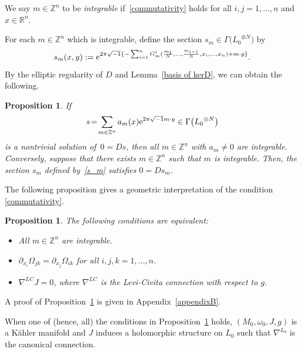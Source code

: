 \documentclass[pdftex]{sigma}
\numberwithin{equation}{section}
\newtheorem{Proposition}[Theorem]{Proposition}
 { \theoremstyle{definition}
\newtheorem{Definition}[Theorem]{Definition}
\newtheorem{Note}[Theorem]{Note}
\newtheorem{Example}[Theorem]{Example}
\newtheorem{Remark}[Theorem]{Remark} }
\newcommand{\R}{\mathbb{R}}
\newcommand{\Z}{\mathbb{Z}}
\begin{document}
\begin{Definition}
We say $m\in \Z^n$ to be \emph{integrable} if~\eqref{commutativity} holds for all $i, j=1,\ldots , n$ and $x\in \R^n$.
\end{Definition}

For each $m\in \Z^n$ which is integrable, define the section $s_m\in \Gamma\bigl({L_0}^{\otimes N}\bigr)$ by
\begin{equation}\label{s_m}
s_m(x,y):={\rm e}^{2\pi\sqrt{-1}\{-\sum_{i=1}^nG_m^i(\frac{m_1}{N},\ldots ,\frac{m_{i-1}}{N},x_i,\ldots ,x_n)+m\cdot y\}} .
\end{equation}
By the elliptic regularity of $D$ and Lemma~\ref{basis of kerD}, we can obtain the following.
\begin{Proposition}\label{existence condition}
If
\[
s\!=\!\sum_{m\in \Z^n}a_m(x){\rm e}^{2\pi\sqrt{-1}m\cdot y}\in \Gamma\bigl({L_0}^{\otimes N}\bigr)
\]
 is a nontrivial solution of~${0\!=\!Ds}$, then all $m\in \Z^n$ with $a_m\not=0$ are integrable. Conversely, suppose that there exists $m\in \Z^n$ such that $m$ is integrable. Then, the section $s_m$ defined by~\eqref{s_m}
satisfies $0=Ds_m$.
\end{Proposition}
%
The following proposition gives a geometric interpretation of the condition \eqref{commutativity}.
\begin{Proposition}\label{prop commutativity2}
The following conditions are equivalent:
\begin{itemize}\itemsep=0pt
\item[$(1$)] All $m\in \Z^n$ are integrable.
\item[$(2)$] $\partial_{x_i}\Omega_{jk}=\partial_{x_j}\Omega_{ik}$ for all $i, j, k=1,\ldots , n$.
\item[$(3)$] $\nabla^{LC} J=0$, where $\nabla^{LC}$ is the Levi-Civita connection with respect to $g$.
\end{itemize}
\end{Proposition}
A proof of Proposition~\ref{prop commutativity2} is given in Appendix~\ref{appendixB}.

\begin{Remark}\label{holomorphic structure}
When one of (hence, all) the conditions in Proposition~\ref{prop commutativity2} holds, $\left(M_0, \omega_0, J, g\right)$ is a K\"ahler manifold and $J$ induces a holomorphic structure on ${L_0}$ such that $\nabla^{L_0}$ is the canonical connection.
\end{Remark}


%
%
\end{document}
